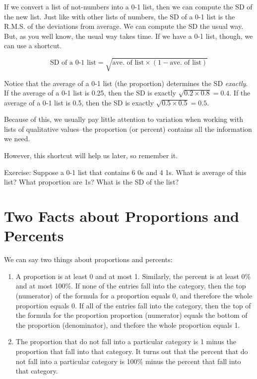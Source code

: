 \documentclass[]{book}
\providecommand{\tightlist}{%
  \setlength{\itemsep}{0pt}\setlength{\parskip}{0pt}}
\theoremstyle{definition}
\theoremstyle{definition}
\theoremstyle{definition}
\theoremstyle{remark}
\begin{document}
If we convert a list of not-numbers into a 0-1 list, then we can compute
the SD of the new list. Just like with other lists of numbers, the SD of
a 0-1 list is the R.M.S. of the deviations from average. We can compute
the SD the usual way. But, as you well know, the usual way takes time.
If we have a 0-1 list, though, we can use a shortcut.

\[\text{SD of a 0-1 list} = \sqrt{\text{ave. of list} \times (1 - \text{ave. of list})}\]

Notice that the average of a 0-1 list (the proportion) determines the SD
\emph{exactly}. If the average of a 0-1 list is 0.25, then the SD is
exactly \(\sqrt{0.2 \times 0.8} = 0.4\). If the average of a 0-1 list is
0.5, then the SD is exactly \(\sqrt{0.5 \times 0.5} = 0.5\).

Because of this, we usually pay little attention to variation when
working with lists of qualitative values--the proportion (or percent)
contains all the information we need.

However, this shortcut will help us later, so remember it.

Exercise: Suppose a 0-1 list that contains 6 0s and 4 1s. What is
average of this list? What proportion are 1s? What is the SD of the
list?

\section{Two Facts about Proportions and
Percents}\label{two-facts-about-proportions-and-percents}

We can say two things about proportions and percents:

\begin{enumerate}
\def\labelenumi{\arabic{enumi}.}
\tightlist
\item
  A proportion is at least 0 and at most 1. Similarly, the percent is at
  least 0\% and at most 100\%. If none of the entries fall into the
  category, then the top (numerator) of the formula for a proportion
  equals 0, and therefore the whole proportion equals 0. If all of the
  entries fall into the category, then the top of the formula for the
  proportion proportion (numerator) equals the bottom of the proportion
  (denominator), and thefore the whole proportion equals 1.
\item
  The proportion that do not fall into a particular category is 1 minus
  the proportion that fall into that category. It turns out that the
  percent that do not fall into a particular category is 100\% minus the
  percent that fall into that category.
\end{enumerate}
\end{document}
